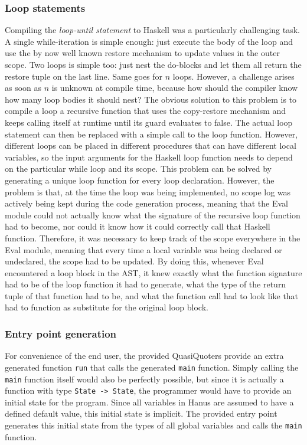 \documentclass[12pt,a4paper]{article}
\begin{document}
\subsubsection{Loop statements}
Compiling the \emph{loop-until statement} to Haskell was a particularly challenging task. A single while-iteration is simple enough: just execute the body of the loop and use the by now well known restore mechanism to update values in the outer scope. Two loops is simple too: just nest the do-blocks and let them all return the restore tuple on the last line. Same goes for $n$ loops. However, a challenge arises as soon as $n$ is unknown at compile time, because how should the compiler know how many loop bodies it should nest? The obvious solution to this problem is to compile a loop a recursive function that uses the copy-restore mechanism and keeps calling itself at runtime until its guard evaluates to false. The actual loop statement can then be replaced with a simple call to the loop function. However, different loops can be placed in different procedures that can have different local variables, so the input arguments for the Haskell loop function needs to depend on the particular while loop and its scope. This problem can be solved by generating a unique loop function for every loop declaration. However, the problem is that, at the time the loop was being implemented, no scope log was actively being kept during the code generation process, meaning that the Eval module could not actually know what the signature of the recursive loop function had to become, nor could it know how it could correctly call that Haskell function. Therefore, it was necessary to keep track of the scope everywhere in the Eval module, meaning that every time a local variable was being declared or undeclared, the scope had to be updated. By doing this, whenever Eval encountered a loop block in the AST, it knew exactly what the function signature had to be of the loop function it had to generate, what the type of the return tuple of that function had to be, and what the function call had to look like that had to function as substitute for the original loop block.

\subsubsection{Entry point generation}
For convenience of the end user, the provided QuasiQuoters provide an extra generated function \texttt{run} that calls the generated \texttt{main} function. Simply calling the \texttt{main} function itself would also be perfectly possible, but since it is actually a function with type \texttt{State -> State}, the programmer would have to provide an initial state for the program. Since all variables in Hanus are assumed to have a defined default value, this initial state is implicit. The provided entry point generates this initial state from the types of all global variables and calls the \texttt{main} function.
\end{document}
